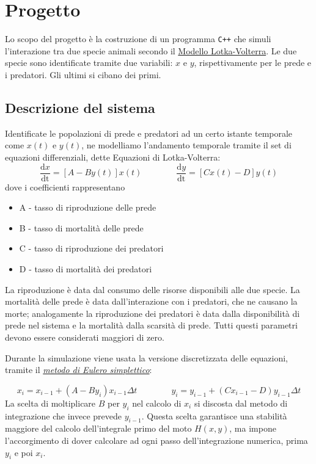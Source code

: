 \section{Progetto}

Lo scopo del progetto è la costruzione di un programma \verb|C++| che simuli l'interazione tra due specie animali secondo il \href{https://it.wikipedia.org/wiki/Equazioni_di_Lotka-Volterra}{Modello Lotka-Volterra}.
Le due specie sono identificate tramite due variabili: $x$ e $y$, rispettivamente per le prede e i predatori. Gli ultimi si cibano dei primi.
\subsection{Descrizione del sistema}
Identificate le popolazioni di prede e predatori ad un certo istante temporale come $x(t)$ e $y(t)$, ne modelliamo l'andamento temporale tramite il set di equazioni differenziali, dette Equazioni di Lotka-Volterra:
\[
    \frac{\mathrm{d}x}{\mathrm{dt}} = \left[ A - B y(t)\right] x(t) \qquad \qquad    \frac{\mathrm{d}y}{\mathrm{dt}} = \left[ C x(t) - D \right] y(t)
\]
dove i coefficienti rappresentano
\begin{itemize}
    \item A - tasso di riproduzione delle prede
    \item B - tasso di mortalità delle prede
    \item C - tasso di riproduzione dei predatori
    \item D - tasso di mortalità dei predatori
\end{itemize}
La riproduzione è data dal consumo delle risorse disponibili alle due specie.
La mortalità delle prede è data dall'interazione con i predatori, che ne causano la morte; analogamente la riproduzione dei predatori è data dalla disponibilità di prede nel sistema e la mortalità dalla scarsità di prede.
Tutti questi parametri devono essere considerati maggiori di zero.

Durante la simulazione viene usata la versione discretizzata delle equazioni, tramite il \href{https://it.wikipedia.org/wiki/Metodo_di_Eulero_semi-implicito}{\textit{metodo di Eulero simplettico}}:

\[
    x_i = x_{i-1} + \left(A - B y_i\right) x_{i-1} \Delta t
    \qquad \qquad
    y_i = y_{i-1} + \left(C x_{i-1} - D\right) y_{i-1} \Delta t
\]
La scelta di moltiplicare $B$ per $y_i$ nel calcolo di $x_i$ si discosta dal metodo di integrazione che invece prevede $y_{i-1}$.
Questa scelta garantisce una stabilità maggiore del calcolo dell'integrale primo del moto $H(x,y)$, ma impone l'accorgimento di dover calcolare ad ogni passo dell'integrazione numerica, prima $y_i$ e poi $x_i$.

